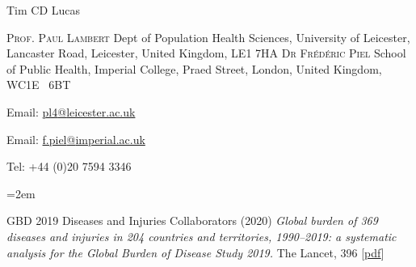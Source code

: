 \documentclass{scrartcl}
\newcommand{\MarginText}[1]{\marginpar{\raggedleft\itshape\small#1}} %
\newcommand{\Description}[1]{\hangindent=2em\hangafter=0\noindent\raggedright\footnotesize{#1}\par\normalsize\vspace{1em}} %
\begin{document}
\begin{cv}{Tim {\Large CD} Lucas}
\begin{multicols}{2}
\begin{footnotesize}
\textsc{Prof. Paul Lambert}\newline
Dept of Population Health Sciences,
\newline
University of Leicester,\newline
Lancaster Road,\newline
Leicester,\newline
United Kingdom,\newline
{\scriptsize LE}1 7{\scriptsize HA}
\vfill
\columnbreak
\textsc{Dr Fr\'{e}d\'{e}ric Piel}\newline
School of Public Health,\newline
Imperial College,\newline
Praed Street,\newline
London,\newline
United Kingdom,\newline
{\scriptsize WC}1{\scriptsize E} \ 6{\scriptsize BT}



\end{footnotesize}
\end{multicols}
\vspace{-0.5cm}
\begin{multicols}{2}
\begin{footnotesize}
Email: \href{mailto:pl4@leicester.ac.uk}{pl4{\scriptsize @}leicester.ac.uk}\newline
\columnbreak


Email: \href{mailto:f.piel@imperial.ac.uk}{f.piel{\scriptsize @}imperial.ac.uk}\newline

Tel: +44 (0)20 7594 3346


\end{footnotesize}
\end{multicols}



\vspace{2em} %


{\color{Maroon}}\vspace{1em}


\Description{\MarginText{2020}GBD 2019 Diseases and Injuries Collaborators (2020) \emph{Global burden of 369 diseases and injuries in 204 countries and territories, 1990–2019: a systematic analysis for the Global Burden of Disease Study 2019.} The Lancet, 396 [\href{https://reader.elsevier.com/reader/sd/pii/S0140673618322256?token=B51BB41EDB592105E398079BFEE0CA91BB2DA80DC879A7B3CFD538DFBF8ADE6FA424858694B94E7860E6AE8461E553E7}{pdf}]}





\end{cv}
\end{document}
